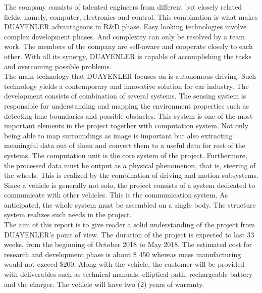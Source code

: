 \documentclass[a4paper,12pt]{article}
\begin{document}
	The company consists of talented engineers from different but closely related fields, namely, computer, electronics and control. This combination is what makes DUAYENLER advantageous in R\&D phase. Easy looking technologies involve complex development phases. And complexity can only be resolved by a team work. The members of the company are self-aware and cooperate closely to each other. With all its synergy, DUAYENLER is capable of accomplishing the tasks and overcoming possible problems.\\
	
	The main technology that DUAYENLER focuses on is autonomous driving. Such technology yields a contemporary and innovative solution for car industry. The development consists of combination of several systems. The sensing system is responsible for understanding and mapping the environment properties such as detecting lane boundaries and possible obstacles. This system is one of the most important elements in the project together with computation system. Not only being able to map surroundings as image is important but also extracting meaningful data out of them and convert them to a useful data for rest of the systems. The computation unit is the core system of the project. Furthermore, the processed data must be output as a physical phenomenon, that is, steering of the wheels. This is realized by the combination of driving and motion subsystems. Since a vehicle is generally not solo, the project consists of a system dedicated to communicate with other vehicles. This is the communication system. As anticipated, the whole system must be assembled on a single body. The structure system realizes such needs in the project.\\
	
	The aim of this report is to give reader a solid understanding of the project from DUAYENLER's point of view. The duration of the project is expected to last 33 weeks, from the beginning of October 2018 to May 2018. The estimated cost for research and development phase is about \$ 450 whereas mass manufacturing would not exceed \$200. Along with the vehicle, the customer will be provided with deliverables such as technical manuals, elliptical path, rechargeable battery and the charger. The vehicle will have two (2) years of warranty.
	
	
\end{document}
